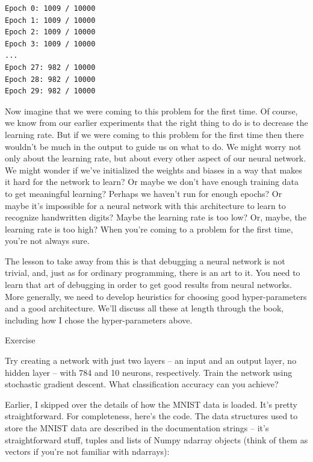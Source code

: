 \documentclass[a4paper,twoside,10pt]{book}
\begin{document}
\begin{lstlisting}
Epoch 0: 1009 / 10000
Epoch 1: 1009 / 10000
Epoch 2: 1009 / 10000
Epoch 3: 1009 / 10000
...
Epoch 27: 982 / 10000
Epoch 28: 982 / 10000
Epoch 29: 982 / 10000
\end{lstlisting}
Now imagine that we were coming to this problem for the first time. Of course, we know from our earlier experiments that the right thing to do is to decrease the learning rate. But if we were coming to this problem for the first time then there wouldn't be much in the output to guide us on what to do. We might worry not only about the learning rate, but about every other aspect of our neural network. We might wonder if we've initialized the weights and biases in a way that makes it hard for the network to learn? Or maybe we don't have enough training data to get meaningful learning? Perhaps we haven't run for enough epochs? Or maybe it's impossible for a neural network with this architecture to learn to recognize handwritten digits? Maybe the learning rate is too low? Or, maybe, the learning rate is too high? When you're coming to a problem for the first time, you're not always sure.

The lesson to take away from this is that debugging a neural network is not trivial, and, just as for ordinary programming, there is an art to it. You need to learn that art of debugging in order to get good results from neural networks. More generally, we need to develop heuristics for choosing good hyper-parameters and a good architecture. We'll discuss all these at length through the book, including how I chose the hyper-parameters above.

\begin{exercize}{Exercise}
	\item Try creating a network with just two layers -- an input and an output layer, no hidden layer -- with 784 and 10 neurons, respectively. Train the network using stochastic gradient descent. What classification accuracy can you achieve?
\end{exercize}
Earlier, I skipped over the details of how the MNIST data is loaded. It's pretty straightforward. For completeness, here's the code. The data structures used to store the MNIST data are described in the documentation strings -- it's straightforward stuff, tuples and lists of Numpy ndarray objects (think of them as vectors if you're not familiar with ndarrays):
\end{document}
